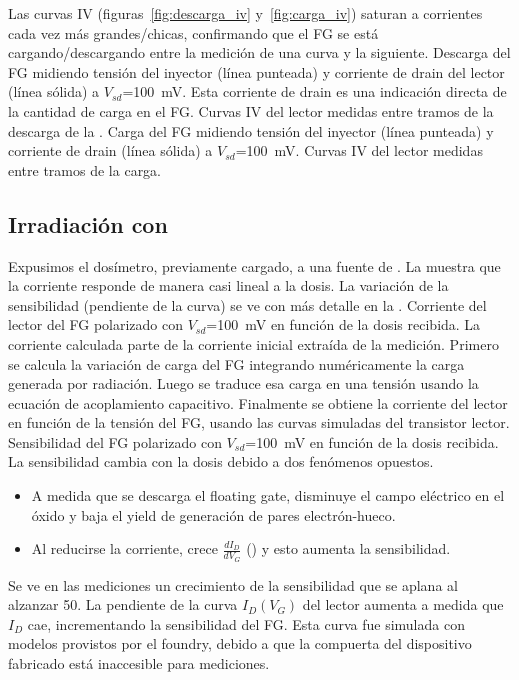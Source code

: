 Las curvas IV (figuras~\ref{fig:descarga_iv}
y~\ref{fig:carga_iv}) saturan a corrientes cada vez más grandes/chicas,
confirmando que el FG se está cargando/descargando 
entre la medición de una curva y la siguiente.
{Descarga del FG midiendo tensión del inyector (línea punteada) y
corriente de drain del lector (línea sólida) a
$V_{sd}$=\SI{100}{\milli\volt}.
Esta corriente de drain es una indicación directa 
de la cantidad de carga en el FG.}
{Curvas IV del lector medidas entre tramos de la descarga
    de la .}
{Carga del FG midiendo tensión del inyector (línea punteada) y
corriente de drain (línea sólida) a
$V_{sd}$=\SI{100}{\milli\volt}.}
{Curvas IV del lector medidas entre tramos de la carga.}
\subsection{Irradiación con \Strontium}
Expusimos el dosímetro,
previamente cargado,
a una fuente de \Strontium.
La  muestra que la corriente responde de
manera casi lineal a la dosis.
La variación de la sensibilidad (pendiente de la curva)
se ve con más detalle en la .
{Corriente del lector del FG polarizado con
    $V_{sd}$=\SI{100}{\milli\volt} en función de la dosis recibida.
La corriente calculada parte de la corriente inicial extraída de la
medición.
Primero se calcula la variación de carga del FG 
integrando numéricamente la carga generada por radiación.
Luego se traduce esa carga en una tensión
usando la ecuación de acoplamiento capacitivo.
Finalmente se obtiene la corriente del lector
en función de la tensión del FG,
usando las curvas simuladas del transistor lector.}
{Sensibilidad del FG polarizado con
    $V_{sd}$=\SI{100}{\milli\volt} en función de la dosis recibida.
}
La sensibilidad cambia con la dosis debido a dos fenómenos opuestos.
\begin{itemize}
    \item A medida que se descarga el floating gate, disminuye el 
        campo eléctrico en el óxido y baja el yield de generación de pares 
        electrón-hueco.
    \item Al reducirse la corriente, crece $\frac{dI_D}{dV_G}$ 
        () y esto aumenta la sensibilidad.
\end{itemize}
Se ve en las mediciones un crecimiento de la sensibilidad que se aplana al
alzanzar \SI{50}{\Gray}.
{La pendiente de la curva $I_D(V_G)$ del lector aumenta a medida que $I_D$ cae,
incrementando la sensibilidad del FG.
Esta curva fue simulada con modelos provistos por el foundry,
debido a que la compuerta del dispositivo fabricado está inaccesible para
mediciones.}
